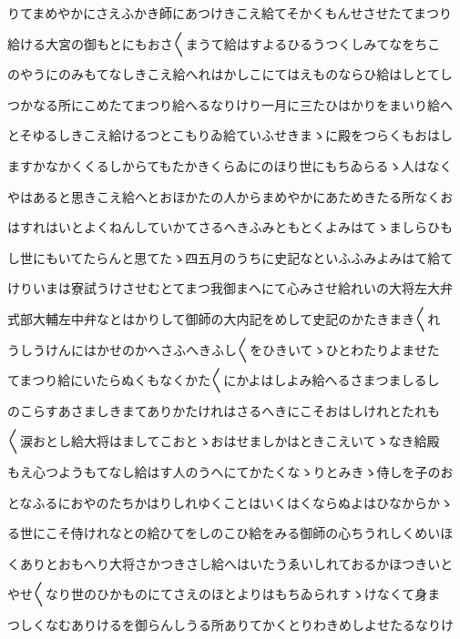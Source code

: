 \documentclass[a4paper,11pt,landscape]{ltjtarticle}
\begin{document}
\par\medskip
りてまめやかにさえふかき師にあつけきこえ給てそかくもんせさせたてまつり
\par\medskip
給ける大宮の御もとにもおさ〱まうて給はすよるひるうつくしみてなをちこ
\par\medskip
のやうにのみもてなしきこえ給へれはかしこにてはえものならひ給はしとてし
\par\medskip
つかなる所にこめたてまつり給へるなりけり一月に三たひはかりをまいり給へ
\par\medskip
とそゆるしきこえ給けるつとこもりゐ給ていふせきまゝに殿をつらくもおはし
\par\medskip
ますかなかくくるしからてもたかきくらゐにのほり世にもちゐらるゝ人はなく
\par\medskip
やはあると思きこえ給へとおほかたの人からまめやかにあためきたる所なくお
\par\medskip
はすれはいとよくねんしていかてさるへきふみともとくよみはてゝましらひも
\par\medskip
し世にもいてたらんと思てたゝ四五月のうちに史記なといふふみよみはて給て
\par\medskip
けりいまは寮試うけさせむとてまつ我御まへにて心みさせ給れいの大将左大弁
\par\medskip
式部大輔左中弁なとはかりして御師の大内記をめして史記のかたきまき〱れ
\par\medskip
うしうけんにはかせのかへさふへきふし〱をひきいてゝひとわたりよませた
\par\medskip
てまつり給にいたらぬくもなくかた〱にかよはしよみ給へるさまつましるし
\par\medskip
のこらすあさましきまてありかたけれはさるへきにこそおはしけれとたれも
\par\medskip
〱涙おとし給大将はましてこおとゝおはせましかはときこえいてゝなき給殿
\par\medskip
もえ心つようもてなし給はす人のうへにてかたくなゝりとみきゝ侍しを子のお
\par\medskip
となふるにおやのたちかはりしれゆくことはいくはくならぬよはひなからかゝ
\par\medskip
る世にこそ侍けれなとの給ひてをしのこひ給をみる御師の心ちうれしくめいほ
\par\medskip
くありとおもへり大将さかつきさし給へはいたうゑいしれておるかほつきいと
\par\medskip
やせ〱なり世のひかものにてさえのほとよりはもちゐられすゝけなくて身ま
\par\medskip
つしくなむありけるを御らんしうる所ありてかくとりわきめしよせたるなりけ
\par\medskip
\end{document}
